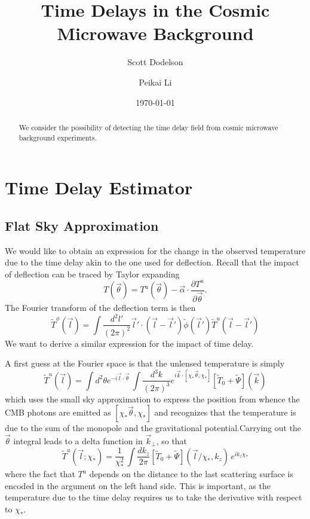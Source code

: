 \documentclass[prd,amsmath,amssymb,floatfix,superscriptaddress,nofootinbib,preprintnumbers]{revtex4-1}
\newcommand{\eql}[1]{\label{eq:#1}}
\begin{document}
\title{\Large Time Delays in the Cosmic Microwave Background}


\author{\large Scott Dodelson}
\author{\large Peikai Li}

\date{\today}

\begin{abstract}
We consider the possibility of detecting the time delay field from cosmic microwave background experiments.
\end{abstract}

\maketitle

\section{Time Delay Estimator}

\subsection{Flat Sky Approximation} We would like to obtain an expression for the change in the observed temperature due to the time delay akin to the one used for deflection. Recall that the impact of deflection can be traced by Taylor expanding
\begin{equation}
T(\vec\theta) = T^u(\vec\theta) - \vec\alpha\cdot \frac{\partial T^u}{\partial\vec\theta}.
\end{equation}
The Fourier transform of the deflection term is then
\begin{equation}
\tilde T^\phi(\vec l) =\int \frac{d^2l'}{(2\pi)^2} \vec l'\cdot (\vec l-\vec l') \tilde\phi(\vec l') \tilde T^u(\vec l-\vec l')
\eql{tphi}\end{equation}
We want to derive a similar expression for the impact of time delay. 

A first guess at the Fourier space is
that the unlensed temperature is simply
\begin{equation}
\tilde T^u(\vec l) = \int d^2\theta e^{-i\vec l\cdot \vec\theta}\, \int \frac{d^3k}{(2\pi)^3} e^{i\vec k\cdot [\chi_*\vec\theta,\chi_*]}  [\tilde T_0+\tilde\Psi](\vec k)
\end{equation}
which uses the small sky approximation to express the position from whence the CMB photons are emitted as $[\chi_*\vec\theta,\chi_*]$ and recognizes that the temperature is due to the sum of the monopole and the gravitational potential.Carrying out the $\vec\theta$ integral leads to a delta function in $\vec k_\perp$, so that 
\begin{equation}
\tilde T^u(\vec l;\chi_*) = 
\frac{1}{\chi_*^2}\, \int \frac{dk_z}{2\pi}  [\tilde T_0+\tilde\Psi](\vec l/\chi_*,k_z)\,e^{ik_z\chi_*}\eql{tu}
\end{equation}
where the fact that $T^u$ depends on the distance to the last scattering surface is encoded in the argument on the left hand side.
This is important, as the temperature due to the time delay requires us to take the derivative with respect to $\chi_*$.
\end{document}
